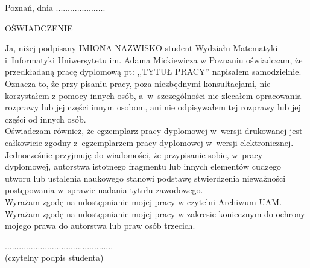 \documentclass[12pt,a4paper,leqno,oneside,titlepage]{book}
\begin{document}

\begin{flushright}{
Poznań, dnia .....................
}\end{flushright}
\begin{center}{
\par
\vspace{1.5cm plus 1.5fill}
{\large OŚWIADCZENIE}
}\end{center}
\par
\vspace{1.5cm plus 1.5fill}%
Ja, niżej podpisany IMIONA NAZWISKO student Wydziału Matematyki i~Informatyki Uniwersytetu im. Adama Mickiewicza w Poznaniu oświadczam, że przedkładaną pracę dyplomową pt: ,,TYTUŁ PRACY'' napisałem samodzielnie. Oznacza to, że przy pisaniu pracy, poza niezbędnymi konsultacjami, nie korzystałem z pomocy innych osób, a~w~szczególności nie zlecałem opracowania rozprawy lub jej części innym osobom, ani nie odpisywałem tej rozprawy lub jej części od innych osób.\\

Oświadczam również, że egzemplarz pracy dyplomowej w~wersji drukowanej jest całkowicie zgodny z~egzemplarzem pracy dyplomowej w~wersji elektronicznej.\\

Jednocześnie przyjmuję do wiadomości, że przypisanie sobie, w~pracy dyplomowej, autorstwa istotnego fragmentu lub innych elementów cudzego utworu lub ustalenia naukowego stanowi podstawę  stwierdzenia  nieważności postępowania w~sprawie nadania tytułu zawodowego.\\

Wyrażam zgodę na udostępnianie mojej pracy w czytelni Archiwum UAM.\\

Wyrażam zgodę na udostępnianie mojej pracy w zakresie koniecznym do ochrony mojego prawa do autorstwa lub praw osób trzecich.
\par
\vspace{1.5cm plus 1.5fill}
\begin{center}{
..............................................\\
{\footnotesize(czytelny podpis studenta)}
}\end{center}

\newpage

\phantom{.}
\end{document}
